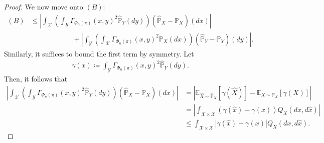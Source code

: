 \documentclass{article}
\theoremstyle{plain}
\theoremstyle{definition}
\theoremstyle{remark}
\begin{document}
\begin{proof}
	We now move onto $(B)$:
	\begin{align*}
		(B) &\leq \left\vert \int_{\mathcal{X}}\left(\int_{\mathcal{Y}} \Gamma_{\Phi_n(\pi)}(x,y)^2 \hat{\mathbb{P}}_Y(dy) \right) (\hat{\mathbb{P}}_X - \mathbb{P}_X)(dx) \right\vert \\
		&\quad\quad\quad\quad\quad\quad + \left\vert \int_{\mathcal{Y}}\left(\int_{\mathcal{X}} \Gamma_{\Phi_n(\pi)}(x,y)^2 \mathbb{P}_X(dx) \right) (\hat{\mathbb{P}}_Y - \mathbb{P}_Y)(dy) \right\vert .
	\end{align*}
	Similarly, it suffices to bound the first term by symmetry. Let
	\begin{align*}
		\gamma(x) \coloneqq \int_{\mathcal{Y}} \Gamma_{\Phi_n(\pi)}(x,y)^2 \hat{\mathbb{P}}_Y(dy) .
	\end{align*}
	Then, it follows that
	\begin{align*}
		\left\vert \int_{\mathcal{X}}\left(\int_{\mathcal{Y}} \Gamma_{\Phi_n(\pi)}(x,y)^2 \hat{\mathbb{P}}_Y(dy) \right) (\hat{\mathbb{P}}_X - \mathbb{P}_X)(dx) \right\vert &= \left\vert \mathbb{E}_{\hat{X} \sim \hat{\mathbb{P}}_X} [\gamma(\hat{X})] - \mathbb{E}_{X \sim \mathbb{P}_X} \left[\gamma(X)\right] \right\vert \\
		&= \left\vert \int_{\mathcal{X} \times \mathcal{X}} (\gamma(\hat{x}) - \gamma(x)) Q_X(dx,d\hat{x}) \right\vert \\
		&\leq \int_{\mathcal{X} \times \mathcal{X}} \left\vert \gamma(\hat{x}) - \gamma(x) \right\vert Q_X(dx,d\hat{x}) .
	\end{align*}
	

\end{proof}
\end{document}
